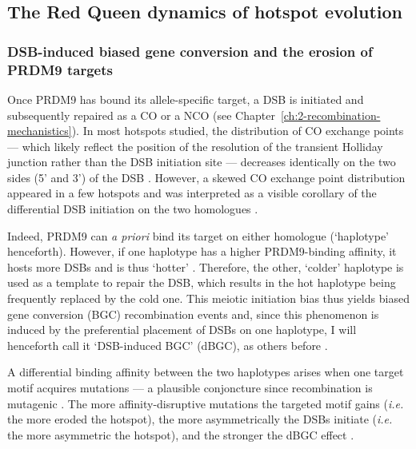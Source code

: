 \subsection{The Red Queen dynamics of hotspot evolution}

\subsubsection{DSB-induced biased gene conversion and the erosion of PRDM9 targets}

Once PRDM9 has bound its allele-specific target, a DSB is initiated and subsequently repaired as a CO or a NCO (see Chapter~\ref{ch:2-recombination-mechanistics}).
In most hotspots studied, the distribution of CO exchange points — which likely reflect the position of the resolution of the transient Holliday junction rather than the DSB initiation site \citep{smith2001homologous} — decreases identically on the two sides (5’ and 3’) of the DSB \citep{arnheim2007mammalian}.
However, a skewed CO exchange point distribution appeared in a few hotspots \citep{jeffreys2002reciprocal,jeffreys2005factors,yauk2003highresolution,neumann2006polymorphism} and was interpreted as a visible corollary of the differential DSB initiation on the two homologues \citep{baudat2007cis}.

Indeed, PRDM9 can \textit{a priori} bind its target on either homologue (‘haplotype’ henceforth). 
However, if one haplotype has a higher PRDM9-binding affinity, it hosts more DSBs and is thus ‘hotter’ \citep{zelazowski2016marks}.
Therefore, the other, ‘colder’ haplotype is used as a template to repair the DSB, which results in the hot haplotype being frequently replaced by the cold one. 
This meiotic initiation bias thus yields biased gene conversion (BGC) recombination events and, since this phenomenon is induced by the preferential placement of DSBs on one haplotype, I will henceforth call it ‘DSB-induced BGC’ (dBGC), as others before \citep{lesecque2014biased, grey2018prdm9}.

A differential binding affinity between the two haplotypes arises when one target motif acquires mutations — a plausible conjoncture since recombination is mutagenic \citep{arbeithuber2015crossovers,rattray2015elevated}.
The more affinity-disruptive mutations the targeted motif gains (\textit{i.e.} the more eroded the hotspot), the more asymmetrically the DSBs initiate (\textit{i.e.} the more asymmetric the hotspot), and the stronger the dBGC effect \citep[reviewed in][]{tiemann-boege2017consequences}.



